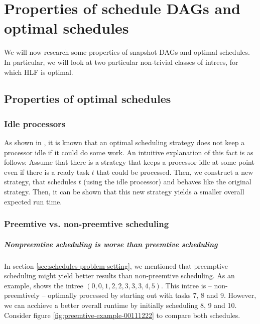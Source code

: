 \chapter{Properties of schedule DAGs and optimal schedules}
\label{chap:p3}

We will now research some properties of snapshot DAGs and optimal schedules. In particular, we will look at two particular non-trivial classes of intrees, for which HLF is optimal.

\section{Properties of optimal schedules}
\label{sec:optimal-schedules-properties}

\subsection{Idle processors}
\label{sec:optimal-schedule-no-idleness}

As shown in \cite{chandyreynoldslargepaper1979}, it is known that an optimal scheduling strategy does not keep a processor idle if it could do some work. An intuitive explanation of this fact is as follows: Assume that there is a strategy that keeps a processor idle at some point even if there is a ready task $t$ that could be processed. Then, we construct a new strategy, that schedules $t$ (using the idle processor) and behaves like the original strategy. Then, it can be shown that this new strategy yields a smaller overall expected run time.

\subsection{Preemtive vs. non-preemtive scheduling}
\label{sec:optimal-schedules-preemtive}

\paragraph{Nonpreemtive scheduling is worse than preemtive scheduling}

\label{preemtiveness-explanation}
In section \ref{sec:schedules-problem-setting}, we mentioned that preemptive scheduling might yield better results than non-preemtive scheduling. As an example, \cite{MoritzMaasDiploma} shows the intree $(0,0,1,2,2,3,3,3,4,5)$. This intree is -- non-preemtively -- optimally processed by starting out with tasks 7, 8 and 9. However, we can acchieve a better overall runtime by initially scheduling 8, 9 and 10. Consider figure \ref{fig:preemtive-example-00111222} to compare both schedules.

